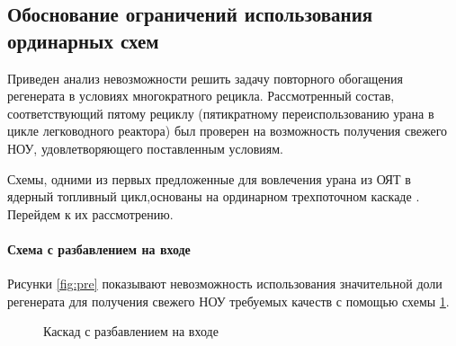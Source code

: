 \subsection{Обоснование ограничений использования ординарных схем}\label{sec:ch1/sec2.1}
Приведен анализ невозможности решить задачу повторного обогащения регенерата в условиях многократного рецикла. Рассмотренный состав, соответствующий пятому рециклу (пятикратному переиспользованию урана в цикле легководного реактора) был проверен на возможность получения свежего НОУ, удовлетворяющего поставленным условиям.

Схемы, одними из первых предложенные для вовлечения урана из ОЯТ в ядерный топливный цикл,основаны на ординарном трехпоточном каскаде \cite{__2012}. Перейдем к их рассмотрению.
\paragraph{Схема с разбавлением на входе}
Рисунки \ref{fig:pre} показывают невозможность использования значительной доли регенерата для получения свежего НОУ требуемых качеств с помощью схемы \ref{fig:diluted_feed}.

\begin{figure}[ht]
  \caption{Каскад с разбавлением на входе}\label{fig:diluted_feed}
\end{figure}

